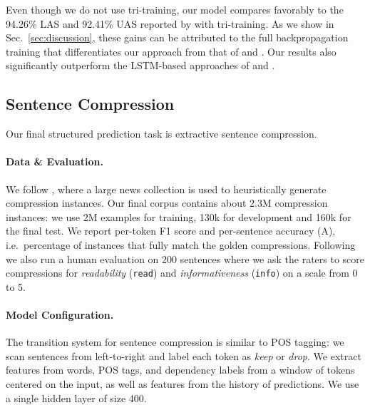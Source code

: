 \documentclass[11pt]{article}
\begin{document}
Even though we do not use tri-training, our model compares favorably to the 94.26\% LAS and 92.41\% UAS
reported by  with tri-training.
As we show in Sec.~\ref{sec:discussion}, these gains can be attributed to the full backpropagation
training that differentiates our approach from that of 
and .
Our results also significantly outperform the LSTM-based approaches of
 and .

 

\subsection{Sentence Compression}

Our final structured prediction task is extractive sentence compression.

\paragraph{Data \& Evaluation.}

We follow , where a large news collection is used to
heuristically generate compression instances.
Our final corpus contains about 2.3M compression instances: we use 2M examples
for training, 130k for development and 160k for the final test.
We report per-token F1 score and per-sentence accuracy (A), i.e.~percentage of
instances that fully match the golden compressions.
Following~ we also run a human evaluation on 200
sentences where we ask the raters to score compressions for \textit{readability}
(\texttt{read}) and \textit{informativeness} (\texttt{info}) on a scale from 0
to 5.

\paragraph{Model Configuration.}

The transition system for sentence compression is similar to POS
tagging: we scan sentences from left-to-right and label each token as
\textit{keep} or \textit{drop}.
We extract features from words, POS tags, and dependency labels from a window of
tokens centered on the input, as well as features from the history of
predictions.
We use a single hidden layer of size 400.
\end{document}
